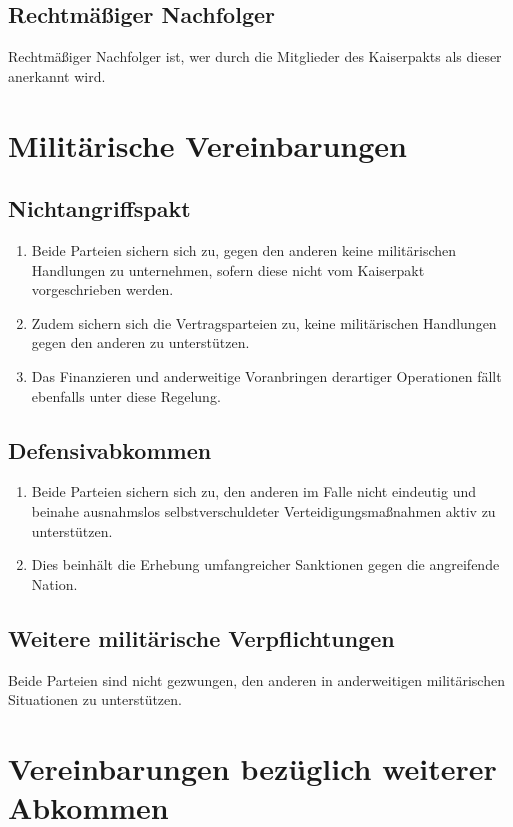 \documentclass{article}
\begin{document}
\subsection{Rechtmäßiger Nachfolger}
Rechtmäßiger Nachfolger ist, wer durch die Mitglieder des Kaiserpakts als dieser anerkannt wird.

\section{Militärische Vereinbarungen}
\subsection{Nichtangriffspakt}
\begin{enumerate}[(1)]
    \item Beide Parteien sichern sich zu, gegen den anderen keine militärischen Handlungen zu unternehmen, sofern diese nicht vom Kaiserpakt vorgeschrieben werden.
    \item Zudem sichern sich die Vertragsparteien zu, keine militärischen Handlungen gegen den anderen zu unterstützen.
    \item Das Finanzieren und anderweitige Voranbringen derartiger Operationen fällt ebenfalls unter diese Regelung.
\end{enumerate}

\subsection{Defensivabkommen}
\begin{enumerate}[(1)]
    \item Beide Parteien sichern sich zu, den anderen im Falle nicht eindeutig und beinahe ausnahmslos selbstverschuldeter Verteidigungsmaßnahmen aktiv zu unterstützen.
    \item Dies beinhält die Erhebung umfangreicher Sanktionen gegen die angreifende Nation.
\end{enumerate}

\subsection{Weitere militärische Verpflichtungen}
Beide Parteien sind nicht gezwungen, den anderen in anderweitigen militärischen Situationen zu unterstützen.

\section{Vereinbarungen bezüglich weiterer Abkommen}
\end{document}
